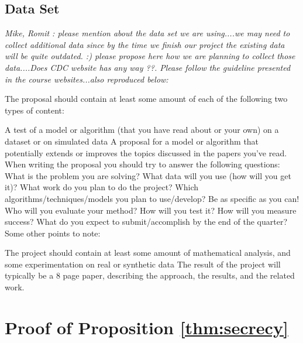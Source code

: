 \documentclass[12pt, journal,onecolumn]{IEEEtran}
\begin{document}
\subsection{Data Set}
\bigskip
{\em{Mike, Romit : please mention about the data set we are using....we may need to collect additional data since by the time we finish our project the existing data will be quite outdated. :)  please propose here how we are planning to collect those data....Does CDC website has any way ??. Please follow the guideline presented in the course websites...also reproduced below: }}


 The proposal should contain at least some amount of each of the following two types of content:

A test of a model or algorithm (that you have read about or your own) on a dataset or on simulated data
A proposal for a model or algorithm that potentially extends or improves the topics discussed in the papers you've read.
When writing the proposal you should try to answer the following questions:
What is the problem you are solving?
What data will you use (how will you get it)?
What work do you plan to do the project?
Which algorithms/techniques/models you plan to use/develop? Be as specific as you can!
Who will you evaluate your method? How will you test it? How will you measure success?
What do you expect to submit/accomplish by the end of the quarter?
Some other points to note:

The project should contain at least some amount of mathematical analysis, and some experimentation on real or synthetic data
The result of the project will typically be a 8 page paper, describing the approach, the results, and the related work.

%


\appendices
\section{Proof of Proposition \ref{thm:secrecy}}




\end{document}
